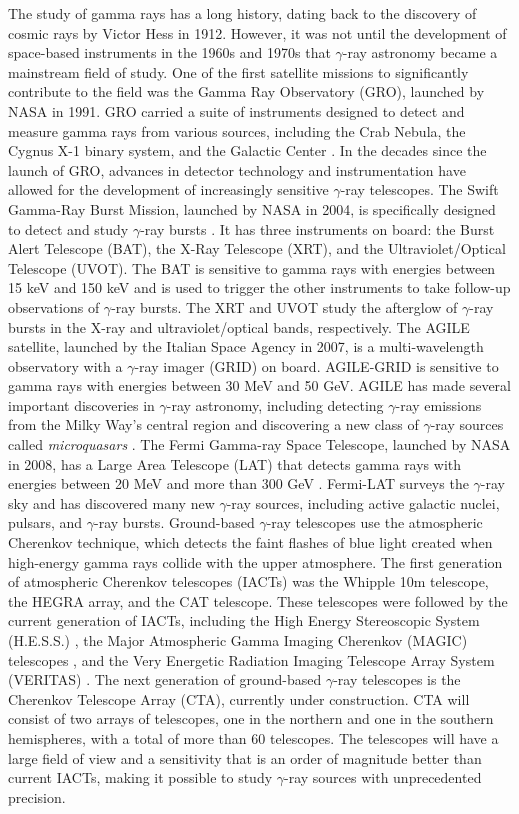 The study of gamma rays has a long history, dating back to the discovery of cosmic rays by Victor Hess in 1912. However, it was not until the development of space-based instruments in the 1960s and 1970s that $\gamma$-ray astronomy became a mainstream field of study. One of the first satellite missions to significantly contribute to the field was the Gamma Ray Observatory (GRO), launched by NASA in 1991. GRO carried a suite of instruments designed to detect and measure gamma rays from various sources, including the Crab Nebula, the Cygnus X-1 binary system, and the Galactic Center \cite{mattox_et_al_1996}. In the decades since the launch of GRO, advances in detector technology and instrumentation have allowed for the development of increasingly sensitive $\gamma$-ray telescopes. The Swift Gamma-Ray Burst Mission, launched by NASA in 2004, is specifically designed to detect and study $\gamma$-ray bursts \cite{swift_2004}. It has three instruments on board: the Burst Alert Telescope (BAT), the X-Ray Telescope (XRT), and the Ultraviolet/Optical Telescope (UVOT). The BAT is sensitive to gamma rays with energies between 15 keV and 150 keV and is used to trigger the other instruments to take follow-up observations of $\gamma$-ray bursts. The XRT and UVOT study the afterglow of $\gamma$-ray bursts in the X-ray and ultraviolet/optical bands, respectively. The AGILE satellite, launched by the Italian Space Agency in 2007, is a multi-wavelength observatory with a $\gamma$-ray imager (GRID) on board. AGILE-GRID is sensitive to gamma rays with energies between 30 MeV and 50 GeV. AGILE has made several important discoveries in $\gamma$-ray astronomy, including detecting $\gamma$-ray emissions from the Milky Way's central region and discovering a new class of $\gamma$-ray sources called \textit{microquasars} \cite{Tavani_2009}. The Fermi Gamma-ray Space Telescope, launched by NASA in 2008, has a Large Area Telescope (LAT) that detects gamma rays with energies between 20 MeV and more than 300 GeV \cite{Abdo2010}. Fermi-LAT surveys the $\gamma$-ray sky and has discovered many new $\gamma$-ray sources, including active galactic nuclei, pulsars, and $\gamma$-ray bursts. Ground-based $\gamma$-ray telescopes use the atmospheric Cherenkov technique, which detects the faint flashes of blue light created when high-energy gamma rays collide with the upper atmosphere. The first generation of atmospheric Cherenkov telescopes (IACTs) was the Whipple 10m telescope, the HEGRA array, and the CAT telescope. These telescopes were followed by the current generation of IACTs, including the High Energy Stereoscopic System (H.E.S.S.) \cite{hess_2000}, the Major Atmospheric Gamma Imaging Cherenkov (MAGIC) telescopes \cite{magic_1999}, and the Very Energetic Radiation Imaging Telescope Array System (VERITAS) \cite{weekes2002very}. The next generation of ground-based $\gamma$-ray telescopes is the Cherenkov Telescope Array (CTA), currently under construction. CTA will consist of two arrays of telescopes, one in the northern and one in the southern hemispheres, with a total of more than 60 telescopes. The telescopes will have a large field of view and a sensitivity that is an order of magnitude better than current IACTs, making it possible to study $\gamma$-ray sources with unprecedented precision.  

